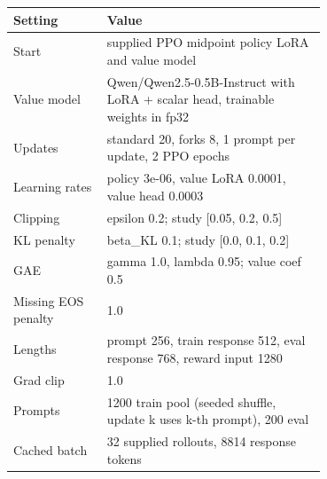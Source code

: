 \begin{tabular}{lp{0.70\linewidth}}
\toprule
Setting & Value \\
\midrule
Start & supplied PPO midpoint policy LoRA and value model \\
Value model & Qwen/Qwen2.5-0.5B-Instruct with LoRA + scalar head, trainable weights in fp32 \\
Updates & standard 20, forks 8, 1 prompt per update, 2 PPO epochs \\
Learning rates & policy 3e-06, value LoRA 0.0001, value head 0.0003 \\
Clipping & epsilon 0.2; study [0.05, 0.2, 0.5] \\
KL penalty & beta\_KL 0.1; study [0.0, 0.1, 0.2] \\
GAE & gamma 1.0, lambda 0.95; value coef 0.5 \\
Missing EOS penalty & 1.0 \\
Lengths & prompt 256, train response 512, eval response 768, reward input 1280 \\
Grad clip & 1.0 \\
Prompts & 1200 train pool (seeded shuffle, update k uses k-th prompt), 200 eval \\
Cached batch & 32 supplied rollouts, 8814 response tokens \\
\bottomrule
\end{tabular}
